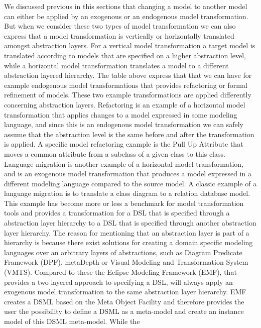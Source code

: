 We discussed previous in this sections that changing a model to another model 
can either be applied by an exogenous or an endogenous model transformation.
But when we consider these two types of model transformation we can also express
that a model transformation is vertically or horizontally translated amongst
abstraction layers. For a vertical model transformation a target model is
translated according to models that are specified on a higher abstraction level,
while a horizontal model transformation translates a model to a different
abstraction layered hierarchy. The table above express that that we can have
for example endogenous model transformations that provides refactoring or
formal refinement of models. These two example transformations are applied
differently concerning abstraction layers. Refactoring is an example of a
horizontal model transformation that applies changes to a model expressed in
some modeling language, and since this is an endogenous model transformation we
can safely assume that the abstraction level is the same before and after the
transformation is applied. A specific model refactoring example is the Pull Up
Attribute\cite{Henshin_2010} that moves a common attribute from a subclass of a
given class to this class. Language migration is another example of a horizontal
model transformation, and is an exogenous model transformation that produces a
model expressed in a different modeling language compared to the source model.
A classic example of a language migration is to translate a class diagram to a
relation database model. This example has become more or less a benchmark for
model transformation tools and provides a transformation for a DSL that is
specified through a abstraction layer hierarchy to a DSL that is specified
through another abstraction layer hierarchy. The reason for mentioning that an
abstraction layer is part of a hierarchy is because there exist solutions for
creating a domain specific modeling languages over an arbitrary layers of
abstractions, such as Diagram Predicate Framework\cite{Lamo2013} (DPF),
metaDepth\cite{de2010deep} or Visual Modeling and Transformation
System\cite{levendovszky2005systematic} (VMTS). Compared to these the
Eclipse Modeling Framework (EMF), that provides a two layered approach to
specifying a DSL, will always apply an exogenous model transformation to the
same abstraction layer hierarchy. EMF creates a DSML based on the Meta Object
Facility and therefore provides the user the possibility to define a DSML
as a meta-model and create an instance model of this DSML meta-model. While the
